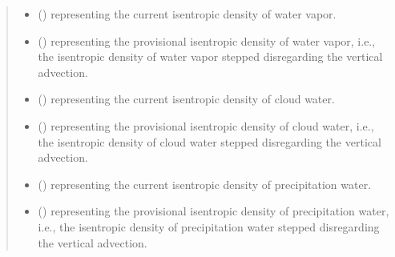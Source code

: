 \documentclass[letterpaper,10pt,english]{sphinxmanual}
\begin{document}
\begin{fulllineitems}
\begin{fulllineitems}
\begin{quote}
\begin{description}
\begin{itemize}
\item {} 
 () \textendash{}  representing the current isentropic density of water vapor.

\item {} 
 () \textendash{}  representing the provisional isentropic density of water vapor,
i.e., the isentropic density of water vapor stepped disregarding the vertical advection.

\item {} 
 () \textendash{}  representing the current isentropic density of cloud water.

\item {} 
 () \textendash{}  representing the provisional isentropic density of cloud water,
i.e., the isentropic density of cloud water stepped disregarding the vertical advection.

\item {} 
 () \textendash{}  representing the current isentropic density of precipitation water.

\item {} 
 () \textendash{}  representing the provisional isentropic density of precipitation water,
i.e., the isentropic density of precipitation water stepped disregarding the vertical advection.

\end{itemize}

\end{description}\end{quote}

\end{fulllineitems}



\end{fulllineitems}
\end{document}
